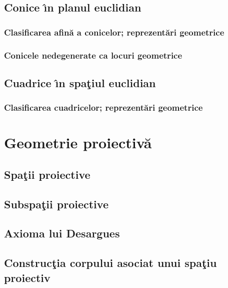 \documentclass[12pt]{book}
\begin{document}
\section{Conice \^{\i}n planul euclidian}
\subsection{Clasificarea afin\u a a conicelor; reprezent\u ari geometrice}
\subsection{Conicele nedegenerate ca locuri geometrice}

\section{Cuadrice \^{\i}n spa\c tiul euclidian}
\subsection{Clasificarea cuadricelor; reprezent\u ari geometrice}


\chapter{Geometrie proiectiv\u a }

\section{Spa\c tii proiective}

\section{Subspa\c tii proiective}

\section{Axioma lui Desargues}

\section{Construc\c tia corpului asociat unui spa\c tiu proiectiv}
\end{document}

